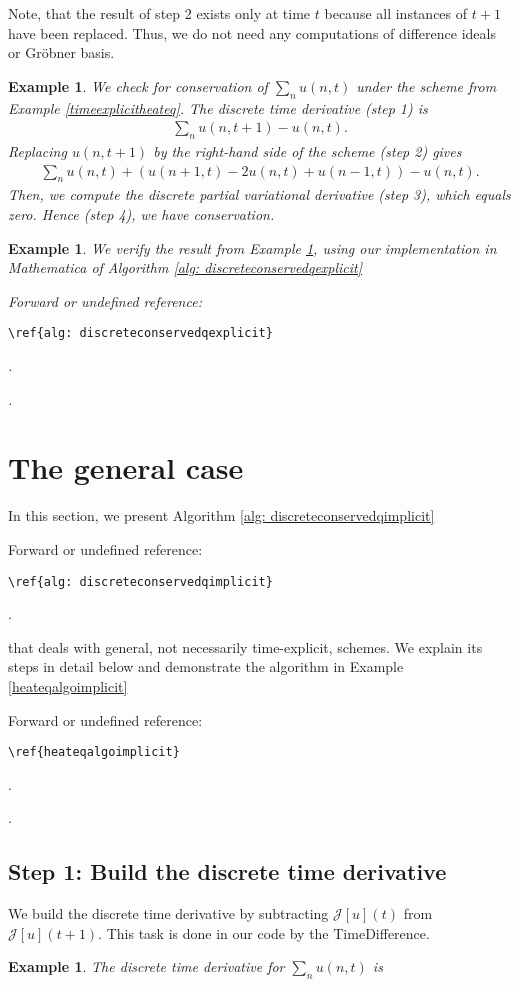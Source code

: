 \documentclass[sigconf,twocolumn]{acmart}
\newcommand{\1}{{\chi}}
\numberwithin{equation}{section}
\theoremstyle{thmlemcorr}
\numberwithin{theorem}{section}
\theoremstyle{thmlemcorr*}
\theoremstyle{defi}
\theoremstyle{remexample}
\newtheorem{example}[theorem]{Example}
\theoremstyle{ass}
\begin{document}
Note, that the result of step 2 exists only at time \(t\) because all instances of \(t+1\) have been replaced. Thus, we do not need any computations of difference ideals or Gr{\"o}bner basis.
\begin{example}
	\label{timeexplicitheateqalgo}
	We check for conservation of \(\sum_nu(n,t)\) under the scheme from Example \ref{timeexplicitheateq}.
	The discrete time derivative (step 1) is
	\begin{gather*}
		\sum_nu(n,t+1)-u(n,t).
	\end{gather*}
	Replacing \(u(n,t+1)\) by the right-hand side of the scheme (step 2) gives
	\begin{gather*}
		\sum_nu(n,t)+(u(n+1,t)-2u(n,t)+u(n-1,t))-u(n,t).
	\end{gather*}
	Then, we compute the discrete partial variational derivative (step 3), which equals zero. Hence (step 4), we have conservation.
\end{example}
\begin{example}
	\label{heatex1}
	We verify the result from Example \ref{timeexplicitheateqalgo}, using our implementation in {\sc Mathematica} of Algorithm \ref{alg: discreteconservedqexplicit}
 {\color{red} Forward or undefined reference: \begin{verbatim}\ref{alg: discreteconservedqexplicit}\end{verbatim}.}
.
	
	\begin{small}
		
		
	\end{small}
\end{example}
\section{The general case}
In this section, we present Algorithm \ref{alg: discreteconservedqimplicit}
 {\color{red} Forward or undefined reference: \begin{verbatim}\ref{alg: discreteconservedqimplicit}\end{verbatim}.}
 that deals with general, not necessarily time-explicit, schemes. We explain its steps in detail below and demonstrate the algorithm in Example \ref{heateqalgoimplicit}
 {\color{red} Forward or undefined reference: \begin{verbatim}\ref{heateqalgoimplicit}\end{verbatim}.}
.

\subsection*{Step 1: Build the discrete time derivative}
We build the discrete time derivative by subtracting \(\mathcal{J}[u](t)\) from \(\mathcal{J}[u](t+1)\). This task is done in our code by the {\sc TimeDifference}.
	\begin{example}
		The discrete time derivative for \(\sum_n u(n,t)\) is
		
		
		\begin{small}
			
			
		\end{small}
	\end{example}
\end{document}
